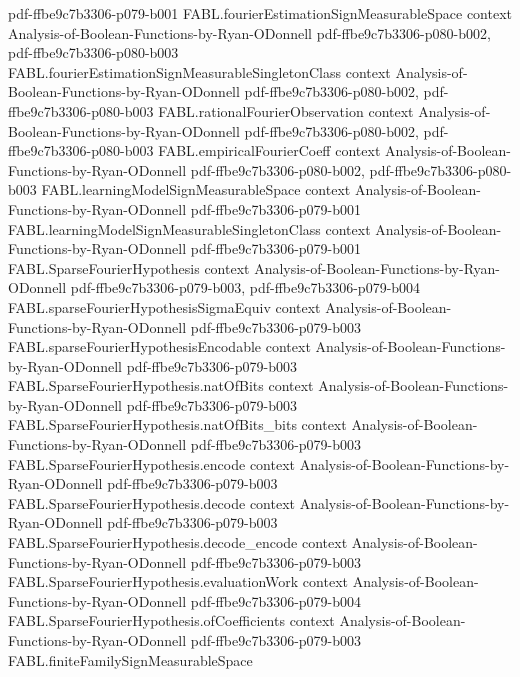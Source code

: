\begin{theorem}
  {pdf-ffbe9c7b3306-p079-b001}
\proofstep
  {FABL.fourierEstimationSignMeasurableSpace}
  {context}
  {Analysis-of-Boolean-Functions-by-Ryan-ODonnell}
  {pdf-ffbe9c7b3306-p080-b002,
    pdf-ffbe9c7b3306-p080-b003}
\proofstep
  {FABL.fourierEstimationSignMeasurableSingletonClass}
  {context}
  {Analysis-of-Boolean-Functions-by-Ryan-ODonnell}
  {pdf-ffbe9c7b3306-p080-b002,
    pdf-ffbe9c7b3306-p080-b003}
\proofstep
  {FABL.rationalFourierObservation}
  {context}
  {Analysis-of-Boolean-Functions-by-Ryan-ODonnell}
  {pdf-ffbe9c7b3306-p080-b002,
    pdf-ffbe9c7b3306-p080-b003}
\proofstep
  {FABL.empiricalFourierCoeff}
  {context}
  {Analysis-of-Boolean-Functions-by-Ryan-ODonnell}
  {pdf-ffbe9c7b3306-p080-b002,
    pdf-ffbe9c7b3306-p080-b003}
\proofstep
  {FABL.learningModelSignMeasurableSpace}
  {context}
  {Analysis-of-Boolean-Functions-by-Ryan-ODonnell}
  {pdf-ffbe9c7b3306-p079-b001}
\proofstep
  {FABL.learningModelSignMeasurableSingletonClass}
  {context}
  {Analysis-of-Boolean-Functions-by-Ryan-ODonnell}
  {pdf-ffbe9c7b3306-p079-b001}
\proofstep
  {FABL.SparseFourierHypothesis}
  {context}
  {Analysis-of-Boolean-Functions-by-Ryan-ODonnell}
  {pdf-ffbe9c7b3306-p079-b003,
    pdf-ffbe9c7b3306-p079-b004}
\proofstep
  {FABL.sparseFourierHypothesisSigmaEquiv}
  {context}
  {Analysis-of-Boolean-Functions-by-Ryan-ODonnell}
  {pdf-ffbe9c7b3306-p079-b003}
\proofstep
  {FABL.sparseFourierHypothesisEncodable}
  {context}
  {Analysis-of-Boolean-Functions-by-Ryan-ODonnell}
  {pdf-ffbe9c7b3306-p079-b003}
\proofstep
  {FABL.SparseFourierHypothesis.natOfBits}
  {context}
  {Analysis-of-Boolean-Functions-by-Ryan-ODonnell}
  {pdf-ffbe9c7b3306-p079-b003}
\proofstep
  {FABL.SparseFourierHypothesis.natOfBits_bits}
  {context}
  {Analysis-of-Boolean-Functions-by-Ryan-ODonnell}
  {pdf-ffbe9c7b3306-p079-b003}
\proofstep
  {FABL.SparseFourierHypothesis.encode}
  {context}
  {Analysis-of-Boolean-Functions-by-Ryan-ODonnell}
  {pdf-ffbe9c7b3306-p079-b003}
\proofstep
  {FABL.SparseFourierHypothesis.decode}
  {context}
  {Analysis-of-Boolean-Functions-by-Ryan-ODonnell}
  {pdf-ffbe9c7b3306-p079-b003}
\proofstep
  {FABL.SparseFourierHypothesis.decode_encode}
  {context}
  {Analysis-of-Boolean-Functions-by-Ryan-ODonnell}
  {pdf-ffbe9c7b3306-p079-b003}
\proofstep
  {FABL.SparseFourierHypothesis.evaluationWork}
  {context}
  {Analysis-of-Boolean-Functions-by-Ryan-ODonnell}
  {pdf-ffbe9c7b3306-p079-b004}
\proofstep
  {FABL.SparseFourierHypothesis.ofCoefficients}
  {context}
  {Analysis-of-Boolean-Functions-by-Ryan-ODonnell}
  {pdf-ffbe9c7b3306-p079-b003}
\proofstep
  {FABL.finiteFamilySignMeasurableSpace}

\end{theorem}
